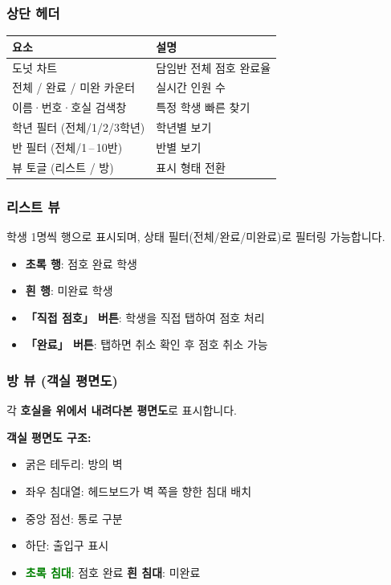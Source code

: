 \documentclass[a4paper,11pt]{article}
\begin{document}
\subsubsection{상단 헤더}

\begin{center}
\begin{tabular}{@{}ll@{}}
  \toprule
  \textbf{요소} & \textbf{설명} \\
  \midrule
  도넛 차트 & 담임반 전체 점호 완료율 \\
  전체 / 완료 / 미완 카운터 & 실시간 인원 수 \\
  이름·번호·호실 검색창 & 특정 학생 빠른 찾기 \\
  학년 필터 (전체/1/2/3학년) & 학년별 보기 \\
  반 필터 (전체/1\,--\,10반) & 반별 보기 \\
  뷰 토글 (리스트 / 방) & 표시 형태 전환 \\
  \bottomrule
\end{tabular}
\end{center}

\subsubsection{리스트 뷰}

학생 1명씩 행으로 표시되며, 상태 필터(전체/완료/미완료)로 필터링 가능합니다.

\begin{itemize}
  \item \textbf{초록 행}: 점호 완료 학생
  \item \textbf{흰 행}: 미완료 학생
  \item \textbf{「직접 점호」 버튼}: 학생을 직접 탭하여 점호 처리
  \item \textbf{「완료」 버튼}: 탭하면 취소 확인 후 점호 취소 가능
\end{itemize}

\subsubsection{방 뷰 (객실 평면도)}

각 \textbf{호실을 위에서 내려다본 평면도}로 표시합니다.

\begin{tcolorbox}[infobox]
\textbf{객실 평면도 구조:}
\begin{itemize}
  \item 굵은 테두리: 방의 벽
  \item 좌우 침대열: 헤드보드가 벽 쪽을 향한 침대 배치
  \item 중앙 점선: 통로 구분
  \item 하단: 출입구 표시
  \item \textcolor{green}{\textbf{초록 침대}}: 점호 완료 \quad \textbf{흰 침대}: 미완료
\end{itemize}
\end{tcolorbox}
\end{document}
